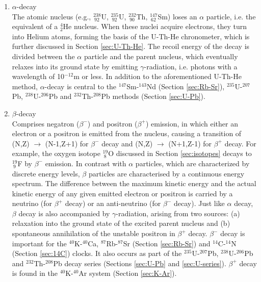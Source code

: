 \documentclass{book}
\begin{document}
\begin{enumerate}
\item{$\alpha$-decay}\\ The atomic nucleus (e.g., $^{238}_{~92}$U,
  $^{235}_{~92}$U, $^{232}_{~90}$Th, $^{147}_{~62}$Sm) loses an
  $\alpha$ particle, i.e. the equivalent of a $^4_2$He nucleus. When
  these nuclei acquire electrons, they turn into Helium atoms, forming
  the basis of the U-Th-He chronometer, which is further discussed in
  Section \ref{sec:U-Th-He}. The recoil energy of the decay is divided
  between the $\alpha$ particle and the parent nucleus, which
  eventually relaxes into its ground state by emitting
  $\gamma$-radiation, i.e. photons with a wavelength of 10$^{-12}$m or
  less.  In addition to the aforementioned U-Th-He method,
  $\alpha$-decay is central to the $^{147}$Sm-$^{143}$Nd (Section
  \ref{sec:Rb-Sr}), $^{235}$U-$^{207}$Pb, $^{238}$U-$^{206}$Pb and
  $^{232}$Th-$^{208}$Pb methods (Section \ref{sec:U-Pb}).

\item{$\beta$-decay}\\ Comprises negatron ($\beta^-$) and positron
  ($\beta^+$) emission, in which either an electron or a positron is
  emitted from the nucleus, causing a transition of (N,Z)
  $\rightarrow$ (N-1,Z+1) for $\beta^-$ decay and (N,Z) $\rightarrow$
  (N+1,Z-1) for $\beta^+$ decay. For example, the oxygen isotope
  $^{19}_{~8}$O discussed in Section \ref{sec:isotopes} decays to
  $^{19}_{~9}$F by $\beta^-$ emission.  In contrast with $\alpha$
  particles, which are characterized by discrete energy levels,
  $\beta$ particles are characterised by a continuous energy
  spectrum. The difference between the maximum kinetic energy and the
  actual kinetic energy of any given emitted electron or positron is
  carried by a neutrino (for $\beta^+$ decay) or an anti-neutrino (for
  $\beta^-$ decay). Just like $\alpha$ decay, $\beta$ decay is also
  accompanied by $\gamma$-radiation, arising from two sources: (a)
  relaxation into the ground state of the excited parent nucleus and
  (b) spontaneous annihilation of the unstable positron in $\beta^+$
  decay. $\beta^-$ decay is important for the $^{40}$K-$^{40}$Ca,
  $^{87}$Rb-$^{87}$Sr (Section \ref{sec:Rb-Sr}) and $^{14}$C-$^{14}$N
  (Section \ref{sec:14C}) clocks. It also occurs as part of the
  $^{235}$U-$^{207}$Pb, $^{238}$U-$^{206}$Pb and $^{232}$Th-$^{208}$Pb
  decay series (Sections \ref{sec:U-Pb} and
  \ref{sec:U-series}). $\beta^+$ decay is found in the
  $^{40}$K-$^{40}$Ar system (Section \ref{sec:K-Ar}).


\end{enumerate}
\end{document}
